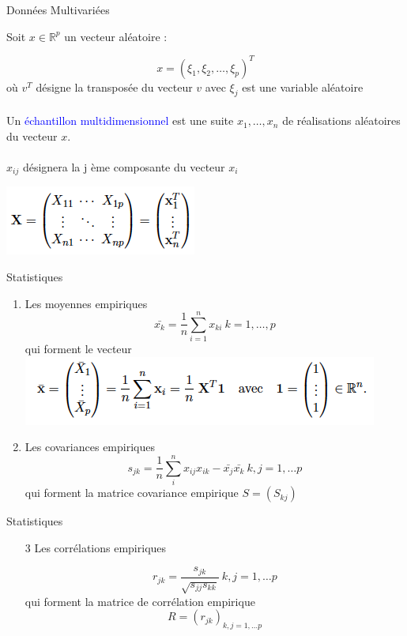 \documentclass[11pt]{beamer}
\begin{document}
\begin{frame}{Données Multivariées}

 Soit $x \in \mathbb{R}^p$ un vecteur aléatoire :
 
 $$ x=(\xi_1,\xi_2, \ldots, \xi_p )^T$$ où $v^T$ désigne la transposée du vecteur $v$  avec $\xi_j$ est une variable aléatoire\\~\\
 Un \textcolor{blue}{échantillon multidimensionnel} est une suite $x_1, \ldots, x_n$ de  réalisations aléatoires du vecteur $x$.\\~\\
 
 $x_{ij}$ désignera la j ème composante du vecteur $x_i$
 
\centering 
 \includegraphics[scale=0.6]{X.png} 
 

\end{frame}
 

\begin{frame}{Statistiques}

  \begin{enumerate}
  \item Les moyennes empiriques
  $$\bar{x_k}=\frac{1}{n}\sum_{i=1}^nx_{ki} \ k=1, \ldots, p $$ qui forment le vecteur 
  \includegraphics[scale=0.6]{X_bar.png} 
  \item
  Les covariances empiriques
  $$ s_{jk}=\frac{1}{n}\sum_{i}^n x_{ij}x_{ik}-\bar{x_j}\bar{x_k}  \  k,j=1, \ldots p $$ qui forment la matrice covariance empirique $ S=(S_{kj}) $
  \end{enumerate}
\end{frame}

 
 \begin{frame}{Statistiques}

  \begin{enumerate}
  \item[3] Les corrélations empiriques
  
  $$ r_{jk}=\frac{s_{jk}}{\sqrt{s_{jj}s_{kk}}}   \  k,j=1, \ldots p $$  qui forment la matrice de corrélation empirique
  $$ R=(r_{jk})_{k, j=1, \ldots p} $$ 
  \end{enumerate}
\end{frame}
\end{document}
